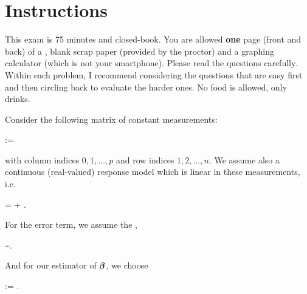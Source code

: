 \documentclass[12pt]{article}
\begin{document}
\section*{Instructions}
This exam is 75 minutes and closed-book. You are allowed \textbf{one} page (front and back) of a , blank scrap paper (provided by the proctor) and a graphing calculator (which is not your smartphone). Please read the questions carefully. Within each problem, I recommend considering the questions that are easy first and then circling back to evaluate the harder ones. No food is allowed, only drinks. %

\pagebreak

\problem Consider the following matrix of constant measurements:

\beqn
\X := 
\eeqn

\noindent with column indices $0, 1, \ldots, p$ and row indices $1, 2, \ldots, n$. We assume also a continuous (real-valued) response model which is linear in these measurements, i.e.

\beqn
\Y = \X\bbeta + \berrorrv.
\eeqn

\noindent For the error term, we assume the ,

\beqn
\berrorrv \sim {}.
\eeqn

\noindent And for our estimator of $\boldsymbol{\beta}$, we choose

\beqn
\B := \XtXinvXt \Y.
\eeqn
\end{document}
